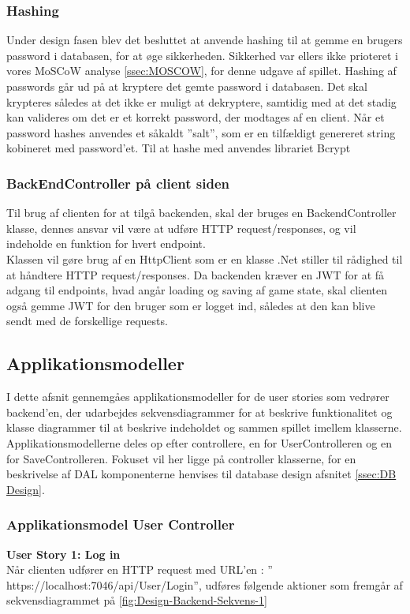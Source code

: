 \subsubsection{Hashing}
\label{sssec: Hashing}
Under design fasen blev det besluttet at anvende hashing til at gemme en brugers password i databasen, for at øge sikkerheden. Sikkerhed var ellers ikke prioteret i vores MoSCoW analyse \autoref{ssec:MOSCOW}, for denne udgave af spillet.
Hashing af passwords går ud på at kryptere det gemte password i databasen. Det skal krypteres således at det ikke er muligt at dekryptere, samtidig med at det stadig kan valideres om det er et korrekt password, der modtages af en client. Når et password hashes anvendes et såkaldt ”salt”, som er en tilfældigt genereret string kobineret med password’et. Til at hashe med anvendes librariet Bcrypt \cite{Bcrypt}\\


\subsubsection{BackEndController på client siden}
Til brug af clienten for at tilgå backenden, skal der bruges en BackendController klasse, dennes ansvar vil være at udføre HTTP request/responses, og vil indeholde en funktion for hvert endpoint.\\
 
Klassen vil gøre brug af en HttpClient som er en klasse .Net stiller til rådighed til at håndtere HTTP request/responses. Da backenden kræver en JWT for at få adgang til endpoints, hvad angår loading og saving af game state, skal clienten også gemme JWT for den bruger som er logget ind, således at den kan blive sendt med de forskellige requests.


\subsection{Applikationsmodeller}
I dette afsnit gennemgåes applikationsmodeller for de user stories som vedrører backend'en, der udarbejdes sekvensdiagrammer for at beskrive funktionalitet og klasse diagrammer til at beskrive indeholdet og sammen spillet imellem klasserne. Applikationsmodellerne deles op efter controllere, en for UserControlleren og en for SaveControlleren. Fokuset vil her ligge på controller klasserne, for en beskrivelse af DAL komponenterne henvises til database design afsnitet \autoref{ssec:DB Design}.\\

\subsubsection{Applikationsmodel User Controller}
\textbf{User Story 1: Log in}\\
Når clienten udfører en HTTP request med URL’en : ” https://localhost:7046/api/User/Login”, udføres følgende aktioner som fremgår af sekvensdiagrammet på \autoref{fig:Design-Backend-Sekvens-1}\\ 

